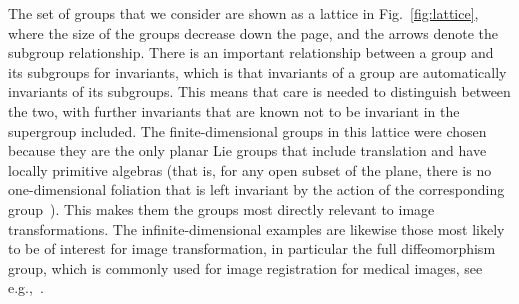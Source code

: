 \documentclass[review,onefignum,onetabnum]{siamonline190516}
\begin{document}
The set of groups that we consider are shown as a lattice in Fig.~\ref{fig:lattice}, where the size of the groups decrease down the page, and the arrows denote the subgroup relationship.  There is an important relationship between a group and its subgroups for invariants, which is that invariants of a group are automatically invariants of its subgroups. This means that care is needed to distinguish between the two, with further invariants that are known not to be invariant in the supergroup included. The finite-dimensional groups in this lattice were chosen because they are the only planar Lie groups that include translation and have locally primitive algebras (that is, for any open subset of the plane, there is no one-dimensional foliation that is left invariant by the action of the corresponding group~\citep{Gonzalez-Lopez90}). This makes them the groups most directly relevant to image transformations. The infinite-dimensional examples are likewise those most likely to be of interest for image transformation, in particular the full diffeomorphism group, which is commonly used for image registration for medical images, see e.g.,~\citet{YounesBook}.

\end{document}
